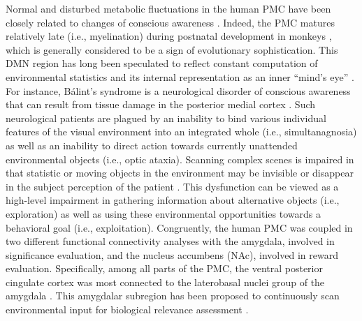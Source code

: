 \documentclass[10pt,letterpaper]{article}
\begin{document}
Normal and disturbed metabolic fluctuations in the
human PMC have been closely related to
changes of conscious awareness \citep{cavanna2006precuneus}.
Indeed,
the PMC matures relatively late (i.e., myelination) during postnatal development in monkeys
\citep{goldman1987development}, which is generally considered to
be a sign of evolutionary sophistication.
%
This DMN region has long been speculated to
reflect constant computation of
environmental statistics and its internal representation
as an inner ``mind's eye'' \citep{cavanna2006precuneus, leech_pcc2014}.
For instance, B\'alint's syndrome is a neurological disorder of conscious
awareness that can result from tissue damage in the posterior medial cortex
\citep{balint1909seelenlahmung, randy2008}.
Such neurological patients are plagued by an
inability to bind various individual features of the visual
environment into an integrated whole (i.e., simultanagnosia)
as well as an inability to direct action towards
currently unattended environmental objects
(i.e., optic ataxia).
%
Scanning complex scenes is impaired in that statistic or moving objects in the
environment may be invisible or disappear in the subject perception of the
patient \citep{mesulam_book, blumenfeld_book}.
%
This dysfunction can be viewed as a high-level impairment in gathering
information about alternative objects (i.e., exploration) as well as
using these environmental opportunities towards a behavioral goal (i.e., exploitation).
Congruently,
the human PMC was coupled in two different functional connectivity analyses
\citep{bzdok2015subspecialization}
with the amygdala, involved in significance evaluation, and
the nucleus accumbens (NAc), involved in reward evaluation.
Specifically, among all parts of the PMC,
the ventral posterior cingulate cortex was
most connected to the laterobasal
nuclei group of the amygdala
\citep{bzdok2015subspecialization}.
This amygdalar subregion has been proposed to
continuously scan environmental input
for biological relevance assessment
\citep{amygdala_bzdok, ghods2009fundamental, baxter2002amygdala}.
\end{document}
